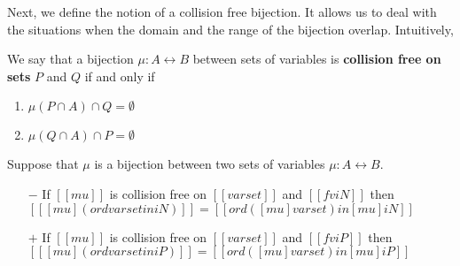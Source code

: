 Next, we define the notion of a collision free bijection.
It allows us to deal with the situations when
the domain and the range of the bijection overlap.
Intuitively, 

\begin{definition} 
  We say that a bijection $\mu : A \leftrightarrow B$ between sets of
  variables is \textbf{collision free on sets} $P$ and $Q$ if and only if
  \begin{enumerate}
    \item $\mu(P \cap A) \cap Q = \emptyset$
    \item $\mu(Q \cap A) \cap P = \emptyset$
  \end{enumerate}
\end{definition}



\begin{lemma}
  \label{lemma:distr-mu-ord}
  Suppose that $\mu$ is a bijection between two sets of variables
  $\mu : A \leftrightarrow B$.
  
  \begin{itemize}
  \item[$-$]
    If $[[mu]]$ is collision free on $[[varset]]$ and $[[fv iN]]$ then
    $[[ [mu] (ord varset in iN) ]] = [[ord ([mu] varset) in [mu] iN ]]$
  \item[$+$]
    If $[[mu]]$ is collision free on $[[varset]]$ and $[[fv iP]]$ then
    $[[ [mu] (ord varset in iP) ]] = [[ord ([mu] varset) in [mu] iP ]]$
  \end{itemize}
\end{lemma}

